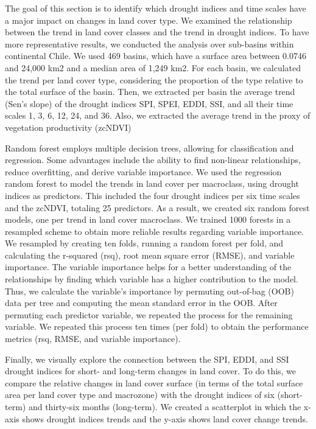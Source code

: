 \documentclass[
  authoryear,
  preprint,
  3p,
  onecolumn]{elsarticle}
\begin{document}
The goal of this section is to identify which drought indices and time
scales have a major impact on changes in land cover type. We examined
the relationship between the trend in land cover classes and the trend
in drought indices. To have more representative results, we conducted
the analysis over sub-basins within continental Chile. We used 469
basins, which have a surface area between 0.0746 and 24,000 km2 and a
median area of 1,249 km2. For each basin, we calculated the trend per
land cover type, considering the proportion of the type relative to the
total surface of the basin. Then, we extracted per basin the average
trend (Sen's slope) of the drought indices SPI, SPEI, EDDI, SSI, and all
their time scales 1, 3, 6, 12, 24, and 36. Also, we extracted the
average trend in the proxy of vegetation productivity (zcNDVI)

Random forest \citep{Ho1995} employs multiple decision trees, allowing
for classification and regression. Some advantages include the ability
to find non-linear relationships, reduce overfitting, and derive
variable importance. We used the regression random forest to model the
trends in land cover per macroclass, using drought indices as
predictors. This included the four drought indices per six time scales
and the zcNDVI, totaling 25 predictors. As a result, we created six
random forest models, one per trend in land cover macroclass. We trained
1000 forests in a resampled scheme to obtain more reliable results
regarding variable importance. We resampled by creating ten folds,
running a random forest per fold, and calculating the r-squared (rsq),
root mean square error (RMSE), and variable importance. The variable
importance helps for a better understanding of the relationships by
finding which variable has a higher contribution to the model. Thus, we
calculate the variable's importance by permuting out-of-bag (OOB) data
per tree and computing the mean standard error in the OOB. After
permuting each predictor variable, we repeated the process for the
remaining variable. We repeated this process ten times (per fold) to
obtain the performance metrics (rsq, RMSE, and variable importance).

Finally, we visually explore the connection between the SPI, EDDI, and
SSI drought indices for short- and long-term changes in land cover. To
do this, we compare the relative changes in land cover surface (in terms
of the total surface area per land cover type and macrozone) with the
drought indices of six (short-term) and thirty-six months (long-term).
We created a scatterplot in which the x-axis shows drought indices
trends and the y-axis shows land cover change trends.
\end{document}
